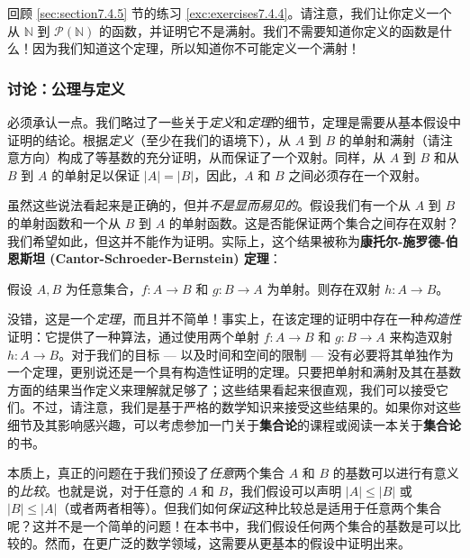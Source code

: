 回顾 \ref{sec:section7.4.5} 节的练习 \ref{exc:exercises7.4.4}。请注意，我们让你定义一个从 $\mathbb{N}$ 到 $\mathcal{P}(\mathbb{N})$ 的函数，并证明它不是满射。我们不需要知道你定义的函数是什么！因为我们知道这个定理，所以知道你不可能定义一个满射！

\subsubsection*{讨论：公理与定义}

必须承认一点。我们略过了一些关于\emph{定义}和\emph{定理}的细节，定理是需要从基本假设中证明的结论。根据\emph{定义}（至少在我们的语境下），从 $A$ 到 $B$ 的单射和满射（请注意方向）构成了等基数的充分证明，从而保证了一个双射。同样，从 $A$ 到 $B$ 和从 $B$ 到 $A$ 的单射足以保证 $|A| = |B|$，因此，$A$ 和 $B$ 之间必须存在一个双射。

虽然这些说法看起来是正确的，但并\emph{不是显而易见的}。假设我们有一个从 $A$ 到 $B$ 的单射函数和一个从 $B$ 到 $A$ 的单射函数。这是否能保证两个集合之间存在双射？我们希望如此，但这并不能作为证明。实际上，这个结果被称为\textbf{康托尔-施罗德-伯恩斯坦 (Cantor-Schroeder-Bernstein) 定理}：

\begin{theorem}
    假设 $A,B$ 为任意集合，$f : A \to B$ 和 $g : B \to A$ 为单射。则存在双射 $h : A \to B$。
\end{theorem}

没错，这是一个\emph{定理}，而且并不简单！事实上，在该定理的证明中存在一种\emph{构造性}证明：它提供了一种算法，通过使用两个单射 $f : A \to B$ 和 $g : B \to A$ 来构造双射 $h : A \to B$。对于我们的目标 --- 以及时间和空间的限制 --- 没有必要将其单独作为一个定理，更别说还是一个具有构造性证明的定理。只要把单射和满射及其在基数方面的结果当作定义来理解就足够了；这些结果看起来很直观，我们可以接受它们。不过，请注意，我们是基于严格的数学知识来接受这些结果的。如果你对这些细节及其影响感兴趣，可以考虑参加一门关于\textbf{集合论}的课程或阅读一本关于\textbf{集合论}的书。

本质上，真正的问题在于我们预设了\emph{任意}两个集合 $A$ 和 $B$ 的基数可以进行有意义的\emph{比较}。也就是说，对于任意的 $A$ 和 $B$，我们假设可以声明 $|A| \le |B|$ 或 $|B| \le |A|$（或者两者相等）。但我们如何\emph{保证}这种比较总是适用于任意两个集合呢？这并不是一个简单的问题！在本书中，我们假设任何两个集合的基数是可以比较的。然而，在更广泛的数学领域，这需要从更基本的假设中证明出来。

